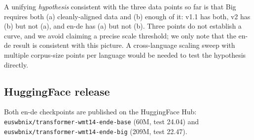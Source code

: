 A unifying \emph{hypothesis} consistent with the three data points so far is that Big requires both (a) cleanly-aligned data and (b) enough of it: v1.1 has both, v2 has (b) but not (a), and en-de has (a) but not (b). Three points do not establish a curve, and we avoid claiming a precise scale threshold; we only note that the en-de result is consistent with this picture. A cross-language scaling sweep with multiple corpus-size points per language would be needed to test the hypothesis directly.

\subsection{HuggingFace release}
Both en-de checkpoints are published on the HuggingFace Hub:
\texttt{euswbnix/transformer-wmt14-ende-base} (60M, test 24.04) and
\texttt{euswbnix/transformer-wmt14-ende-big} (209M, test 22.47).
